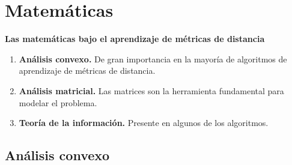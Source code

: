 \documentclass[10pt, compress]{beamer}
\begin{document}
\section{Matemáticas}


\begin{frame}

  \begin{tcolorbox}[colback=ChetwodeBlue!10,colframe=ChetwodeBlue!60]
    \begin{center}
      {\color{TurkishRose} \small\textbf{Las matemáticas bajo el aprendizaje de métricas de distancia}} \\
      \begin{enumerate}

        \item \textbf{Análisis convexo.} De gran importancia en la mayoría de algoritmos de aprendizaje de métricas de distancia.

        \item \textbf{Análisis matricial.} Las matrices son la herramienta fundamental para modelar el problema.

        \item \textbf{Teoría de la información.} Presente en algunos de los algoritmos.

        \end{enumerate}
    \end{center}
  \end{tcolorbox}

\end{frame}

\subsection{Análisis convexo}
\end{document}
